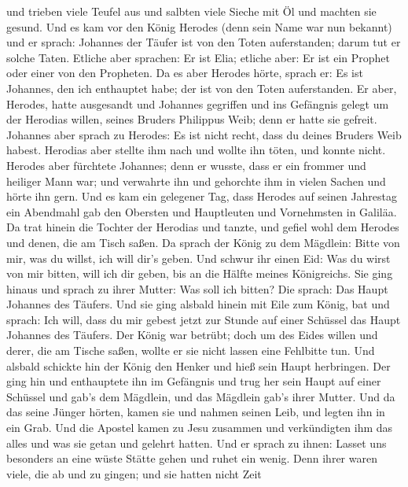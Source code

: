  und trieben viele Teufel aus und salbten viele Sieche mit
Öl und machten sie gesund.  Und es kam vor den König
Herodes (denn sein Name war nun bekannt) und er sprach: Johannes der
Täufer ist von den Toten auferstanden; darum tut er solche Taten.
 Etliche aber sprachen: Er ist Elia; etliche aber: Er ist
ein Prophet oder einer von den Propheten.  Da es aber
Herodes hörte, sprach er: Es ist Johannes, den ich enthauptet habe; der
ist von den Toten auferstanden.  Er aber, Herodes, hatte
ausgesandt und Johannes gegriffen und ins Gefängnis gelegt um der
Herodias willen, seines Bruders Philippus Weib; denn er hatte sie
gefreit.  Johannes aber sprach zu Herodes: Es ist nicht
recht, dass du deines Bruders Weib habest.  Herodias aber
stellte ihm nach und wollte ihn töten, und konnte nicht. 
Herodes aber fürchtete Johannes; denn er wusste, dass er ein frommer und
heiliger Mann war; und verwahrte ihn und gehorchte ihm in vielen Sachen
und hörte ihn gern.  Und es kam ein gelegener Tag, dass
Herodes auf seinen Jahrestag ein Abendmahl gab den Obersten und
Hauptleuten und Vornehmsten in Galiläa.  Da trat hinein die
Tochter der Herodias und tanzte, und gefiel wohl dem Herodes und denen,
die am Tisch saßen. Da sprach der König zu dem Mägdlein: Bitte von mir,
was du willst, ich will dir's geben.  Und schwur ihr einen
Eid: Was du wirst von mir bitten, will ich dir geben, bis an die Hälfte
meines Königreichs.  Sie ging hinaus und sprach zu ihrer
Mutter: Was soll ich bitten? Die sprach: Das Haupt Johannes des Täufers.
 Und sie ging alsbald hinein mit Eile zum König, bat und
sprach: Ich will, dass du mir gebest jetzt zur Stunde auf einer Schüssel
das Haupt Johannes des Täufers.  Der König war betrübt;
doch um des Eides willen und derer, die am Tische saßen, wollte er sie
nicht lassen eine Fehlbitte tun.  Und alsbald schickte hin
der König den Henker und hieß sein Haupt herbringen. Der ging hin und
enthauptete ihn im Gefängnis  und trug her sein Haupt auf
einer Schüssel und gab's dem Mägdlein, und das Mägdlein gab's ihrer
Mutter.  Und da das seine Jünger hörten, kamen sie und
nahmen seinen Leib, und legten ihn in ein Grab.  Und die
Apostel kamen zu Jesu zusammen und verkündigten ihm das alles und was
sie getan und gelehrt hatten.  Und er sprach zu ihnen:
Lasset uns besonders an eine wüste Stätte gehen und ruhet ein wenig.
Denn ihrer waren viele, die ab und zu gingen; und sie hatten nicht Zeit
